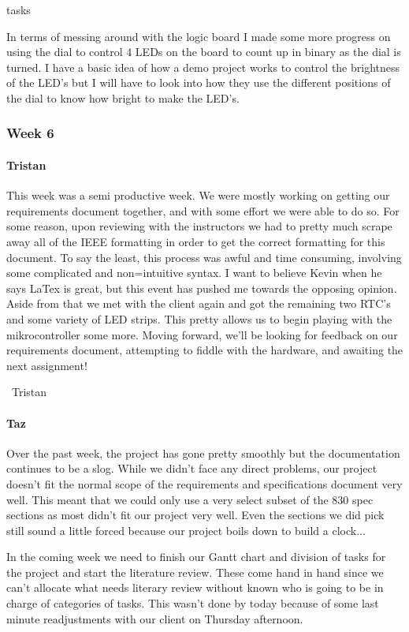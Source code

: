 tasks\documentclass[onecolumn, draftclsnofoot,10pt, compsoc]{IEEEtran}
\begin{document}
In terms of messing around with the logic board I made some more progress on using the dial to control 4 LEDs on the board to count up in binary as the dial is turned. I have a basic idea of how a demo project works to control the brightness of the LED's but I will have to look into how they use the different positions of the dial to know how bright to make the LED's.
\subsubsection{Week 6}
\paragraph{Tristan}
This week was a semi productive week. We were mostly working on getting our requirements document together, and with some effort we were able to do so. For some reason, upon reviewing with the instructors we had to pretty much scrape away all of the IEEE formatting in order to get the correct formatting for this document. To say the least, this process was awful and time consuming, involving some complicated and non=intuitive syntax. I want to believe Kevin when he says LaTex is great, but this event has pushed me towards the opposing opinion. Aside from that we met with the client again and got the remaining two RTC's and some variety of LED strips. This pretty allows us to begin playing with the mikrocontroller some more. Moving forward, we'll be looking for feedback on our requirements document, attempting to fiddle with the hardware, and awaiting the next assignment!

~Tristan
\paragraph{Taz}
Over the past week, the project has gone pretty smoothly but the documentation continues to be a slog. While we didn't face any direct problems, our project doesn't fit the normal scope of the requirements and specifications document very well. This meant that we could only use a very select subset of the 830 spec sections as most didn't fit our project very well. Even the sections we did pick still sound a little forced because our project boils down to build a clock...

In the coming week we need to finish our Gantt chart and division of tasks for the project and start the literature review. These come hand in hand since we can't allocate what needs literary review without known who is going to be in charge of categories of tasks. This wasn't done by today because of some last minute readjustments with our client on Thursday afternoon.
\end{document}
